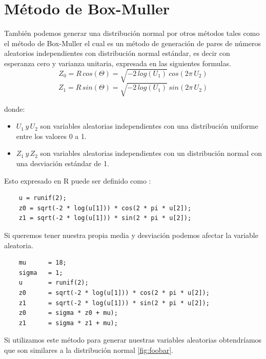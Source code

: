 \documentclass[]{article}
\begin{document}
\section{Método de Box-Muller}
También podemos generar una distribución normal por otros métodos tales como el método de Box-Muller el cual es un método de generación de pares de números aleatorios independientes con distribución normal estándar, es decir con esperanza cero y varianza unitaria, expresada en las siguientes formulas.
\[Z_{0} = R\, cos(\Theta ) = \sqrt{-2\, log(U_{1})}\,  cos(2\pi\,  U_{2})\]
\[Z_{1} = R\, sin(\Theta ) = \sqrt{-2\, log(U_{1})}\,  sin(2\pi\,  U_{2})\]

donde:
\begin{itemize}
	\item $U_{1}\, y\, U_{2}$ son variables aleatorias independientes con una distribución uniforme entre los valores 0 a 1.
	\item $Z_{1}\, y\, Z_{2}$ son variables aleatorias independientes con un distribución normal con una desviación estándar de 1.
\end{itemize}

Esto expresado en R puede ser definido como :
  \begin{lstlisting}
    u = runif(2);
    z0 = sqrt(-2 * log(u[1])) * cos(2 * pi * u[2]);
    z1 = sqrt(-2 * log(u[1])) * sin(2 * pi * u[2]);
   \end{lstlisting}
Si queremos tener nuestra propia media y desviación podemos afectar la variable aleatoria.
  \begin{lstlisting}
    mu      = 18;
    sigma   = 1;
    u       = runif(2);
    z0      = sqrt(-2 * log(u[1])) * cos(2 * pi * u[2]);
    z1      = sqrt(-2 * log(u[1])) * sin(2 * pi * u[2]);
    z0      = sigma * z0 + mu);
    z1      = sigma * z1 + mu);
   \end{lstlisting}
Si utilizamos este método para generar nuestras variables aleatorias obtendríamos que son similares a la distribución normal \autoref{fig:foobar}. 
\end{document}
